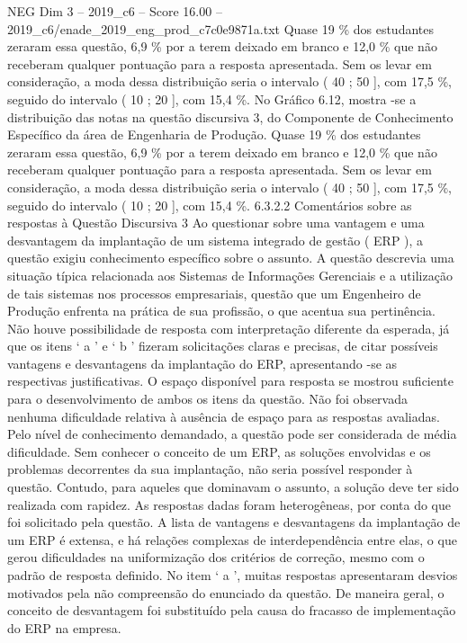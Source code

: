 \begin{textsample}{NEG Dim 3 – 2019\_c6 – Score 16.00 – 2019\_c6/enade\_2019\_eng\_prod\_c7c0e9871a.txt}
Quase 19 \% dos estudantes zeraram essa questão, 6,9 \% por a terem deixado em branco e 12,0 \% que não receberam qualquer pontuação para a resposta apresentada.
Sem os levar em consideração, a moda dessa distribuição seria o intervalo ( 40 ; 50 ], com 17,5 \%, seguido do intervalo ( 10 ; 20 ], com 15,4 \%.
No Gráfico 6.12, mostra -se a distribuição das notas na questão discursiva 3, do Componente de Conhecimento Específico da área de Engenharia de Produção.
Quase 19 \% dos estudantes zeraram essa questão, 6,9 \% por a terem deixado em branco e 12,0 \% que não receberam qualquer pontuação para a resposta apresentada.
Sem os levar em consideração, a moda dessa distribuição seria o intervalo ( 40 ; 50 ], com 17,5 \%, seguido do intervalo ( 10 ; 20 ], com 15,4 \%. 6.3.2.2 Comentários sobre as respostas à Questão Discursiva 3 Ao questionar sobre uma vantagem e uma desvantagem da implantação de um sistema integrado de gestão ( ERP ), a questão exigiu conhecimento específico sobre o assunto.
A questão descrevia uma situação típica relacionada aos Sistemas de Informações Gerenciais e a utilização de tais sistemas nos processos empresariais, questão que um Engenheiro de Produção enfrenta na prática de sua profissão, o que acentua sua pertinência.
Não houve possibilidade de resposta com interpretação diferente da esperada, já que os itens ‘ a ’ e ‘ b ’ fizeram solicitações claras e precisas, de citar possíveis vantagens e desvantagens da implantação do ERP, apresentando -se as respectivas justificativas.
O espaço disponível para resposta se mostrou suficiente para o desenvolvimento de ambos os itens da questão.
Não foi observada nenhuma dificuldade relativa à ausência de espaço para as respostas avaliadas.
Pelo nível de conhecimento demandado, a questão pode ser considerada de média dificuldade.
Sem conhecer o conceito de um ERP, as soluções envolvidas e os problemas decorrentes da sua implantação, não seria possível responder à questão.
Contudo, para aqueles que dominavam o assunto, a solução deve ter sido realizada com rapidez.
As respostas dadas foram heterogêneas, por conta do que foi solicitado pela questão.
A lista de vantagens e desvantagens da implantação de um ERP é extensa, e há relações complexas de interdependência entre elas, o que gerou dificuldades na uniformização dos critérios de correção, mesmo com o padrão de resposta definido.
No item ‘ a ’, muitas respostas apresentaram desvios motivados pela não compreensão do enunciado da questão.
De maneira geral, o conceito de desvantagem foi substituído pela causa do fracasso de implementação do ERP na empresa.

\end{textsample}
